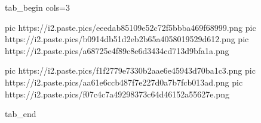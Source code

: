  
 
 
 
 

\ifcmt
  tab_begin cols=3

     pic https://i2.paste.pics/eeedab85109e52c72f5bbba469f68999.png
		 pic https://i2.paste.pics/b0914db51d2eb2b65a4058019529d612.png
		 pic https://i2.paste.pics/a68725e4f89c8e6d3434cd713d9bfa1a.png

		 pic https://i2.paste.pics/f1f2779e7330b2aae6e45943d70ba1c3.png
		 pic https://i2.paste.pics/aa61e6ccb487f7e227d0a7b7fcb013ad.png
		 pic https://i2.paste.pics/f07c4c7a49298373c64d46152a55627e.png

  tab_end
\fi
